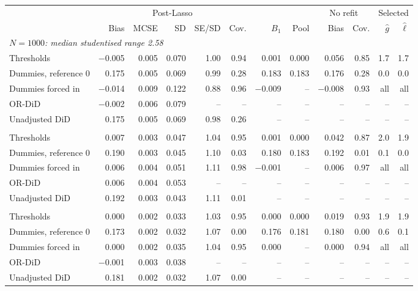 \begin{tabular}{l rrrrr rr rr rr}
\toprule
 & \multicolumn{5}{c}{Post-Lasso} & & & \multicolumn{2}{c}{No refit} & \multicolumn{2}{c}{Selected} \\
\cmidrule(lr){2-6} \cmidrule(lr){9-10} \cmidrule(lr){11-12}
 & Bias & MCSE & SD & SE/SD & Cov. & $B_1$ & Pool & Bias & Cov. & $\hat g$ & $\hat\ell$ \\
\midrule
\multicolumn{12}{l}{\emph{$N=1000$: median studentised range 2.58}} \\
\quad Thresholds & $-$0.005 & 0.005 & 0.070 & 1.00 & 0.94 & 0.001 & 0.000 & 0.056 & 0.85 & 1.7 & 1.7 \\
\quad Dummies, reference 0 & 0.175 & 0.005 & 0.069 & 0.99 & 0.28 & 0.183 & 0.183 & 0.176 & 0.28 & 0.0 & 0.0 \\
\quad Dummies forced in & $-$0.014 & 0.009 & 0.122 & 0.88 & 0.96 & $-$0.009 & -- & $-$0.008 & 0.93 & all & all \\
\quad OR-DiD & $-$0.002 & 0.006 & 0.079 & -- & -- & -- & -- & -- & -- & -- & -- \\
\quad Unadjusted DiD & 0.175 & 0.005 & 0.069 & 0.98 & 0.26 & -- & -- & -- & -- & -- & -- \\
\addlinespace
\multicolumn{12}{l}{\emph{$N=2000$: median studentised range 3.70}} \\
\quad Thresholds & 0.007 & 0.003 & 0.047 & 1.04 & 0.95 & 0.001 & 0.000 & 0.042 & 0.87 & 2.0 & 1.9 \\
\quad Dummies, reference 0 & 0.190 & 0.003 & 0.045 & 1.10 & 0.03 & 0.180 & 0.183 & 0.192 & 0.01 & 0.1 & 0.0 \\
\quad Dummies forced in & 0.006 & 0.004 & 0.051 & 1.11 & 0.98 & $-$0.001 & -- & 0.006 & 0.97 & all & all \\
\quad OR-DiD & 0.006 & 0.004 & 0.053 & -- & -- & -- & -- & -- & -- & -- & -- \\
\quad Unadjusted DiD & 0.192 & 0.003 & 0.043 & 1.11 & 0.01 & -- & -- & -- & -- & -- & -- \\
\addlinespace
\multicolumn{12}{l}{\emph{$N=4000$: median studentised range 5.06}} \\
\quad Thresholds & 0.000 & 0.002 & 0.033 & 1.03 & 0.95 & 0.000 & 0.000 & 0.019 & 0.93 & 1.9 & 1.9 \\
\quad Dummies, reference 0 & 0.173 & 0.002 & 0.032 & 1.07 & 0.00 & 0.176 & 0.181 & 0.180 & 0.00 & 0.6 & 0.1 \\
\quad Dummies forced in & 0.000 & 0.002 & 0.035 & 1.04 & 0.95 & 0.000 & -- & 0.000 & 0.94 & all & all \\
\quad OR-DiD & $-$0.001 & 0.003 & 0.038 & -- & -- & -- & -- & -- & -- & -- & -- \\
\quad Unadjusted DiD & 0.181 & 0.002 & 0.032 & 1.07 & 0.00 & -- & -- & -- & -- & -- & -- \\
\bottomrule
\end{tabular}
